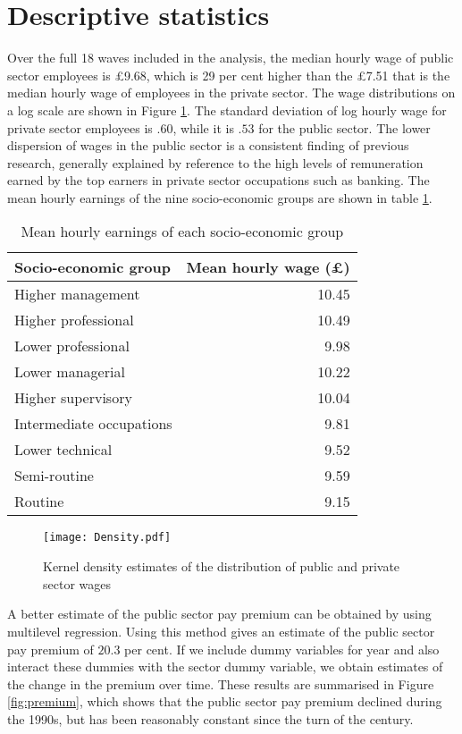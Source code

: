 \documentclass[a4paper,11pt,titlepage]{article}
\begin{document}
\section{Descriptive statistics}
Over the full 18 waves included in the analysis, the median hourly wage of public sector employees is \pounds 9.68, which is 29 per cent higher than the \pounds 7.51 that is the median hourly wage of employees in the private sector.  The wage distributions on a log scale are shown in Figure \ref{fig:density}.  The standard deviation of log hourly wage for private sector employees is $.60$, while it is $.53$ for the public sector.  The lower dispersion of wages in the public sector is a consistent finding of previous research, generally explained by reference to the high levels of remuneration earned by the top earners in private sector occupations such as banking.  The mean hourly earnings of the nine socio-economic groups are shown in table \ref{tab:wages}.

\begin{table}
\caption{Mean hourly earnings of each socio-economic group \label{tab:wages}}
\begin{center}
\begin{tabular}{lr}
\toprule
Socio-economic group & Mean hourly wage (\pounds)\\
\midrule
  Higher management & 10.45 \\
  Higher professional & 10.49 \\
  Lower professional & 9.98 \\
  Lower managerial & 10.22 \\
  Higher supervisory & 10.04 \\
  Intermediate occupations & 9.81 \\
  Lower technical & 9.52 \\
  Semi-routine & 9.59 \\
  Routine & 9.15 \\
\bottomrule
\end{tabular}
\end{center}
\end{table}

\begin{figure}[tb]
    \centering
    \texttt{[image: Density.pdf]}
    \caption{Kernel density estimates of the distribution of public and private sector wages\label{fig:density}}
\end{figure}

A better estimate of the public sector pay premium can be obtained by using multilevel regression.  Using this method gives an estimate of the public sector pay premium of $20.3$ per cent.  If we include dummy variables for year and also interact these dummies with the sector dummy variable, we obtain estimates of the change in the premium over time.  These results are summarised in Figure \ref{fig:premium}, which shows that the public sector pay premium declined during the 1990s, but has been reasonably constant since the turn of the century.
\end{document}
